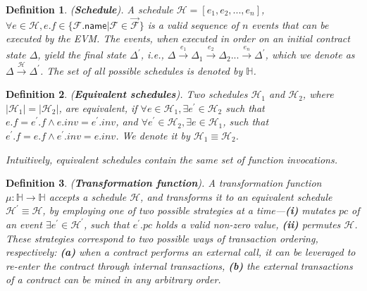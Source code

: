 \documentclass[conference, romanappendices]{tex/IEEEtran}
\theoremstyle{bfnote}
\newcommand{\ie}{\textit{i.e.}}
\newtheorem{definition}{Definition}
\begin{document}
\vspace{-2mm}
\begin{definition}
	(\textbf{Schedule}).
	A \textit{schedule} $\mathcal{H} = [e_1, e_2, ..., e_n]$, $\forall e \in \mathcal{H}, e.f \in \{\mathcal{F}.\mathsf{name} |\mathcal{F} \in \vec{\mathcal{F}}\}$ is a valid sequence of $n$ events that can be executed by the EVM.
	The events, when executed in order on an initial contract state $\Delta$, yield the final state $\Delta^\prime$, \ie, $\Delta \xrightarrow{e_1} \Delta_1 \xrightarrow{e_2} \Delta_2... \xrightarrow{e_n} \Delta^\prime$, which we denote as $\Delta \xrightarrow{\mathcal{H}} \Delta^\prime$.
	The set of all possible schedules is denoted by $\mathbb{H}$.
\end{definition}

\vspace{-4mm}
\begin{definition}
	(\textbf{Equivalent schedules}).
	Two schedules $\mathcal{H}_1$ and $\mathcal{H}_2$, where $|\mathcal{H}_1| = |\mathcal{H}_2|$, are \textit{equivalent}, if $\forall e \in \mathcal{H}_1, \exists e^\prime \in \mathcal{H}_2$ such that 
	$e.f = e^\prime.f \land e.inv = e^\prime.inv$, and
		$\forall e^\prime \in \mathcal{H}_2, \exists e \in \mathcal{H}_1$, such that 
	$e^\prime.f = e.f \land e^\prime.inv = e.inv$.
	We denote it by $\mathcal{H}_1 \equiv \mathcal{H}_2$.
	
	Intuitively, equivalent schedules contain the same set of function invocations.
\end{definition}

\vspace{-4mm}
\begin{definition}
	(\textbf{Transformation function}).
	A transformation function $\mu: \mathbb{H} \rightarrow \mathbb{H}$ accepts a schedule $\mathcal{H}$, and transforms it to an equivalent schedule $\mathcal{H}^\prime \equiv \mathcal{H}$, by employing one of two possible strategies at a time---\textbf{(i)} mutates $pc$ of an event $\exists e^\prime \in \mathcal{H}^\prime$, such that $e^\prime.pc$ holds a valid non-zero value, 
	\textbf{(ii)} permutes $\mathcal{H}$.
	These strategies correspond to two possible ways of transaction ordering, respectively:
	\textbf{(a)} when a contract performs an external call, it can be leveraged to re-enter the contract through internal transactions,
	\textbf{(b)} the external transactions of a contract can be mined in any arbitrary order.
\end{definition}
\end{document}
